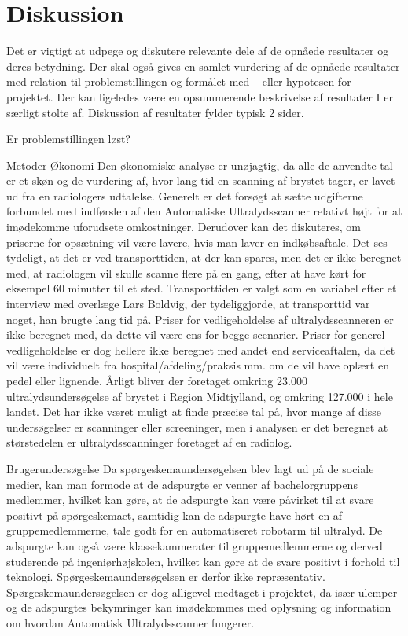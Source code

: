 \chapter{Diskussion}\label{kapitel_Diskussion}
Det er vigtigt at udpege og diskutere relevante dele af de opnåede resultater og deres betydning. Der skal også gives en samlet vurdering af de opnåede resultater med relation til problemstillingen og formålet med – eller hypotesen for – projektet. Der kan ligeledes være en opsummerende beskrivelse af resultater I er særligt stolte af. Diskussion af resultater fylder typisk 2 sider.

Er problemstillingen løst? 

Metoder
Økonomi
Den økonomiske analyse er unøjagtig, da alle de anvendte tal er et skøn og de vurdering af, hvor lang tid en scanning af brystet tager, er lavet ud fra en radiologers udtalelse. Generelt er det forsøgt at sætte udgifterne forbundet med indførslen af den Automatiske Ultralydsscanner relativt højt for at imødekomme uforudsete omkostninger. Derudover kan det diskuteres, om priserne for opsætning vil være lavere, hvis man laver en indkøbsaftale. Det ses tydeligt, at det er ved transporttiden, at der kan spares, men det er ikke beregnet med, at radiologen vil skulle scanne flere på en gang, efter at have kørt for eksempel 60 minutter til et sted. Transporttiden er valgt som en variabel efter et interview med overlæge Lars Boldvig, der tydeliggjorde, at transporttid var noget, han brugte lang tid på. Priser for vedligeholdelse af ultralydsscanneren er ikke beregnet med, da dette vil være ens for begge scenarier. Priser for generel vedligeholdelse er dog hellere ikke beregnet med andet end serviceaftalen, da det vil være individuelt fra hospital/afdeling/praksis mm. om de vil have oplært en pedel eller lignende. Årligt bliver der foretaget omkring 23.000 ultralydsundersøgelse af brystet i Region Midtjylland, og omkring 127.000 i hele landet. Det har ikke været muligt at finde præcise tal på, hvor mange af disse undersøgelser er scanninger eller screeninger, men i analysen er det beregnet at størstedelen er ultralydsscanninger foretaget af en radiolog.  

Brugerundersøgelse
Da spørgeskemaundersøgelsen blev lagt ud på de sociale medier, kan man formode at de adspurgte er venner af bachelorgruppens medlemmer, hvilket kan gøre, at de adspurgte kan være påvirket til at svare positivt på spørgeskemaet, samtidig kan de adspurgte have hørt en af gruppemedlemmerne, tale godt for en automatiseret robotarm til ultralyd. De adspurgte kan også være klassekammerater til gruppemedlemmerne og derved studerende på ingeniørhøjskolen, hvilket kan gøre at de svare positivt i forhold til teknologi. Spørgeskemaundersøgelsen er derfor ikke repræsentativ. Spørgeskemaundersøgelsen er dog alligevel medtaget i projektet, da især ulemper og de adspurgtes bekymringer kan imødekommes med oplysning og information om hvordan Automatisk Ultralydsscanner fungerer. 

